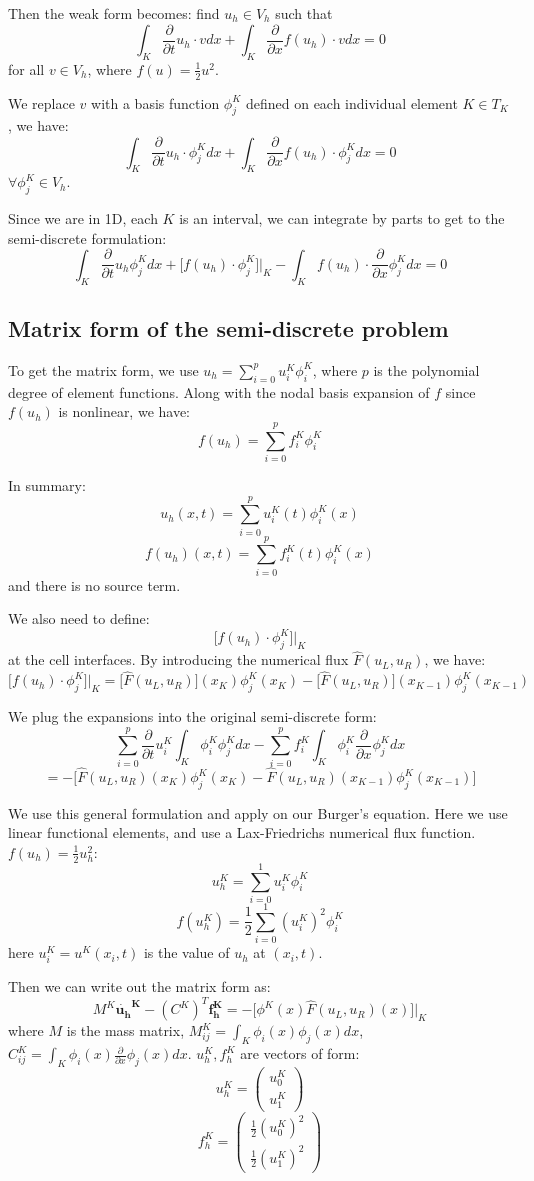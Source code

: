 \documentclass[12pt]{article} %
\newcommand{\pdx}[1]{\frac{\partial}{\partial {#1}}}
\newcommand{\1}[1]{\mathds{1}\left[#1\right]}
\begin{document}
Then the weak form becomes: find $u_h\in V_h$ such that
$$
	\int_{K}\pdx{t}u_h\cdot vdx + \int_{K}\pdx{x}f(u_h)\cdot vdx = 0
$$ for all $v\in V_h$, where $f(u) = \frac12 u^2$.

We replace $v$ with a basis function $\phi_j^K$ defined on each individual element $K \in T_K$, we have:
$$
	\int_{K}\pdx{t}u_h \cdot \phi_j^K dx + \int_{K}\pdx{x}f(u_h)\cdot \phi_j^Kdx = 0
$$ $\forall \phi_j^K\in V_h$.

Since we are in 1D, each $K$ is an interval, we can integrate by parts to get to the semi-discrete formulation:
$$
	\int_{K}\pdx{t}u_h\phi_j^Kdx + \bigg[f(u_h)\cdot\phi_j^K\bigg]\bigg\rvert_K - \int_Kf(u_h)\cdot\pdx{x}\phi_j^Kdx  = 0
$$
\subsection{Matrix form of the semi-discrete problem}
To get the matrix form, we use $u_h = \sum_{i=0}^{p}u_i^K\phi_i^K$, where $p$ is the polynomial degree of element functions. Along with the nodal basis expansion of $f$ since $f(u_h)$ is nonlinear, we have:
$$
	f(u_h) = \sum_{i=0}^{p}f_{i}^K\phi_i^K
$$

In summary:
$$
	u_h(x,t) = \sum_{i=0}^pu_i^K(t)\phi_i^K(x)
$$
$$
	f(u_h)(x,t) = \sum_{i=0}^pf_i^K(t)\phi_i^K(x)
$$ and there is no source term.

We also need to define:
$$
	\bigg[f(u_h)\cdot\phi_j^K\bigg]\bigg\rvert_K 
$$ at the cell interfaces. By introducing the numerical flux $\hat{F}(u_L,u_R)$, we have:
$$
	\bigg[f(u_h)\cdot\phi_j^K\bigg]\bigg\rvert_K = 
	\bigg[\hat{F}(u_L,u_R)\bigg](x_K)\phi_j^K(x_K) - 
	\bigg[\hat{F}(u_L,u_R)\bigg](x_{K-1})\phi_j^K(x_{K-1})
$$

We plug the expansions into the original semi-discrete form:
$$
	\sum_{i=0}^p\pdx{t}u_i^K\int_{K}\phi_i^K\phi_j^Kdx
	- \sum_{i=0}^pf_{i}^K\int_{K}\phi_i^K\pdx{x}\phi_j^Kdx
$$
$$
	= - \bigg[\hat{F}(u_L,u_R)(x_K)\phi_j^K(x_K) - \hat{F}(u_L,u_R)(x_{K-1})\phi_j^K(x_{K-1})\bigg]
$$

We use this general formulation and apply on our Burger's equation. Here we use linear functional elements, and use a Lax-Friedrichs numerical flux function. $f(u_h) = \frac12 u_h^2$:
$$
	u_h^K = \sum_{i=0}^1u_{i}^K\phi_i^K
$$
$$
	f(u_h^K)= \frac12\sum_{i=0}^1(u_i^K)^2\phi_i^K
$$ here $u_i^K = u^K(x_i,t)$ is the value of $u_h$ at $(x_i, t)$.

Then we can write out the matrix form as:
\begin{equation}\label{eqn:matform}
	M^K\mathbf{\dot{u_h}^K} - (C^K)^T\mathbf{f_{h}^K} =
	-\bigg[\phi^K(x)\hat{F}(u_L,u_R)(x)\bigg]\bigg\rvert_K
\end{equation} where $M$ is the mass matrix, $M_{ij}^K = \int_{K}\phi_i(x)\phi_j(x)dx$, $C_{ij}^K = \int_{K}\phi_i(x)\pdx{x}\phi_j(x)dx$. $u_h^K,f_h^K$ are vectors of form:
$$
	u_h^K = 
	\begin{pmatrix}
		u_0^K \\
		u_1^K
	\end{pmatrix}
$$
$$
	f_h^K =
	\begin{pmatrix}
		\frac12(u_0^K)^2 \\
		\frac12(u_1^K)^2
	\end{pmatrix}
$$
\end{document}
